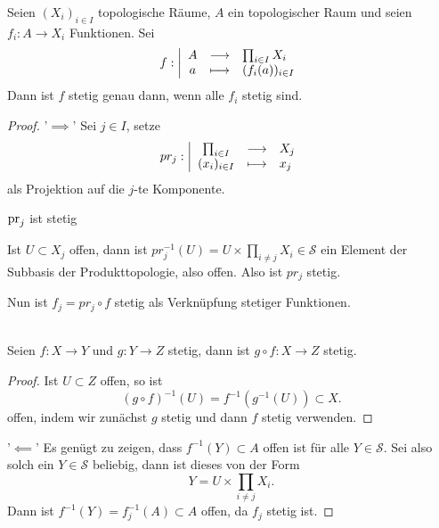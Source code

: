 \begin{theorem}\label{thm:universelle-eigenschaft-des-produkts}
    Seien $(X_i)_{i\in I}$ topologische Räume, $A$ ein topologischer Raum und seien $f_i : A \to  X_i$ Funktionen. Sei
        \begin{equation*}
        f: \left| \begin{array}{c c l} 
        A & \longrightarrow & \prod_{i \in I} X_i \\
        a & \longmapsto &  (f_i(a))_{i \in I}
        \end{array} \right.
    \end{equation*}
    Dann ist $f$ stetig genau dann, wenn alle  $f_i$ stetig sind.
\end{theorem}
\begin{proof}
    '$\implies$' Sei $j\in I$, setze
        \begin{equation*}
        pr_j: \left| \begin{array}{c c l} 
        \prod_{i\in I}  & \longrightarrow & X_j \\
        (x_i)_{i \in I} & \longmapsto &  x_j
        \end{array} \right.
    \end{equation*}
    als Projektion auf die $j$-te Komponente.
     \begin{claim}
        $\operatorname{pr}_j$ ist stetig
    \end{claim}
    \begin{subproof}
        Ist $U\subset X_j$ offen, dann ist $pr_j^{-1}(U) = U\times \prod_{i\neq j} X_i\in \mathcal{S}$ ein Element der Subbasis der Produkttopologie, also offen. Also ist $pr_j$ stetig.
    \end{subproof}
    Nun ist $f_j = pr_j \circ  f$ stetig als Verknüpfung stetiger Funktionen.
    \begin{recap}
        \\
        Seien $f:X\to Y$ und $g:Y\to Z$ stetig, dann ist $g\circ  f : X \to  Z$ stetig.
        \begin{proof}
            Ist $U\subset Z$ offen, so ist
            \[
                (g \circ  f) ^{-1}(U) = f^{-1}(g^{-1}(U)) \subset X
            .\] 
            offen, indem wir zunächst $g$ stetig und dann  $f$ stetig verwenden.
        \end{proof}
    \end{recap}
    '$\impliedby$' Es genügt zu zeigen, dass $f^{-1}(Y)\subset A$ offen ist für alle $Y\in \mathcal{S}$. Sei also solch ein $Y\in \mathcal{S}$ beliebig, dann ist dieses von der Form
    \[
    Y = U\times \prod_{i\neq j} X_i
    .\] 
    Dann ist $f^{-1}(Y) = f^{-1}_j(A)\subset A$ offen, da $f_j$ stetig ist.
\end{proof}
